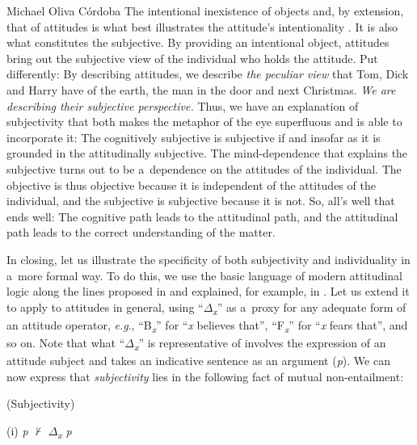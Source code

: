 \begin{artengenv}{Michael Oliva Córdoba}
The intentional inexistence of objects and, by extension, that of attitudes is what best illustrates the attitude's intentionality 
\parencite[cf.][p.xvi]{brentano_introduction_2009}. %
 It is also what constitutes the subjective. By providing an intentional object, attitudes bring out the subjective view of the individual who holds the attitude. Put differently: By describing attitudes, we describe \textit{the peculiar view} that Tom, Dick and Harry have of the earth, the man in the door and next Christmas. \textit{We are describing their subjective perspective.} Thus, we have an explanation of subjectivity that both makes the metaphor of the eye superfluous and is able to incorporate it: The cognitively subjective is subjective if and insofar as it is grounded in the attitudinally subjective. The mind-dependence that explains the subjective turns out to be a~dependence on the attitudes of the individual. The objective is thus objective because it is independent of the attitudes of the individual, and the subjective is subjective because it is not. So, all's well that ends well: The cognitive path leads to the attitudinal path, and the attitudinal path leads to the correct understanding of the matter.



In closing, let us illustrate the specificity of both subjectivity and individuality in a~more formal way. To do this, we use the basic language of modern attitudinal logic along the lines proposed in 
\parencite[][]{hintikka_knowledge_1962} %
 and explained, for example, in 
\parencite[][p.7]{ditmarsch_handbook_2015}. %
 Let us extend it to apply to attitudes in general, using ``$\Delta $\textit{\textsubscript{x}}'' as a~proxy for any adequate form of an attitude operator, \textit{e.g}., ``B\textit{\textsubscript{x}}'' for ``\textit{x} believes that'', ``F\textit{\textsubscript{x}}'' for ``\textit{x} fears that'', and so on. Note that what ``$\Delta $\textit{\textsubscript{x}}'' is representative of involves the expression of an attitude subject and takes an indicative sentence as an argument (\textit{p}). We can now express that \textit{subjectivity} lies in the following fact of mutual non-entailment:

\medskip

(Subjectivity)



(i) \textit{p} ${\nvdash}$ $\Delta $\textit{\textsubscript{x}} \textit{p}




\end{artengenv}
